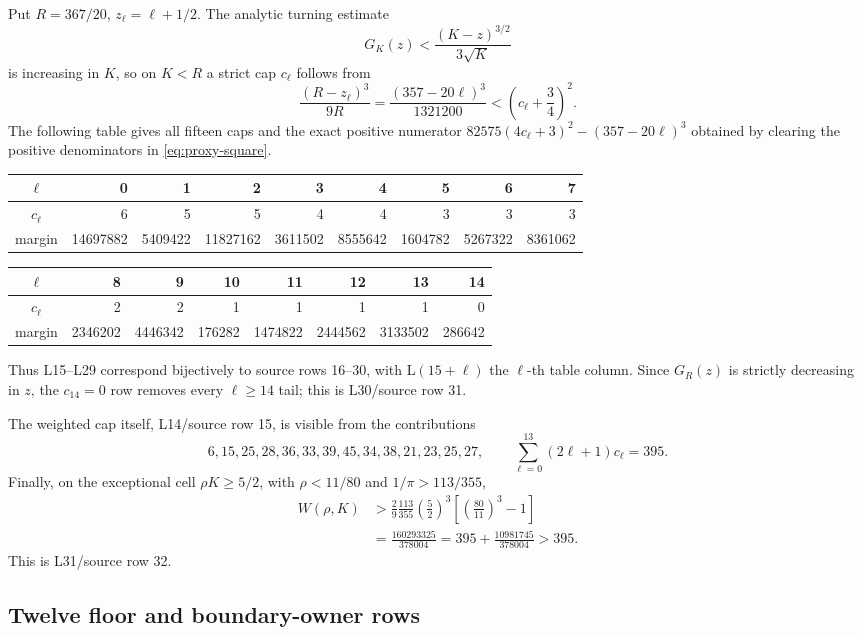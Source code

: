 \documentclass[11pt]{article}
\begin{document}
Put \(R=367/20\), \(z_\ell=\ell+1/2\).  The analytic turning estimate
\[
 G_K(z)<\frac{(K-z)^{3/2}}{3\sqrt K}
\]
is increasing in \(K\), so on \(K<R\) a strict cap \(c_\ell\) follows
from
\begin{equation}
 \frac{(R-z_\ell)^3}{9R}
 =\frac{(357-20\ell)^3}{1321200}
 <\left(c_\ell+\frac34\right)^2.
 \label{eq:proxy-square}
\end{equation}
The following table gives all fifteen caps and the exact positive numerator
\(82575(4c_\ell+3)^2-(357-20\ell)^3\) obtained by clearing the
positive denominators in \eqref{eq:proxy-square}.
\begin{center}
\scriptsize
\begin{tabular}{c|rrrrrrrr}
\toprule
\(\ell\)&0&1&2&3&4&5&6&7\\
\midrule
\(c_\ell\)&6&5&5&4&4&3&3&3\\
margin
&14697882&5409422&11827162&3611502&8555642
&1604782&5267322&8361062\\
\bottomrule
\end{tabular}

\medskip
\begin{tabular}{c|rrrrrrr}
\toprule
\(\ell\)&8&9&10&11&12&13&14\\
\midrule
\(c_\ell\)&2&2&1&1&1&1&0\\
margin&2346202&4446342&176282&1474822&2444562&3133502&286642\\
\bottomrule
\end{tabular}
\end{center}
Thus L15--L29 correspond bijectively to source rows 16--30, with
L\((15+\ell)\) the \(\ell\)-th table column.  Since \(G_R(z)\) is
strictly decreasing in \(z\), the \(c_{14}=0\) row removes every
\(\ell\ge14\) tail; this is L30/source row 31.

The weighted cap itself, L14/source row 15, is visible from the contributions
\[
 6,15,25,28,36,33,39,45,34,38,21,23,25,27,
 \qquad \sum_{\ell=0}^{13}(2\ell+1)c_\ell=395.
\]
Finally, on the exceptional cell \(\rho K\ge5/2\), with
\(\rho<11/80\) and \(1/\pi>113/355\),
\begin{align*}
 W(\rho,K)
 &>\frac{2}{9}\frac{113}{355}\left(\frac52\right)^3
 \left[\left(\frac{80}{11}\right)^3-1\right]\\
 &=\frac{160293325}{378004}
 =395+\frac{10981745}{378004}>395.
\end{align*}
This is L31/source row 32.

\subsection{Twelve floor and boundary-owner rows}
\end{document}
